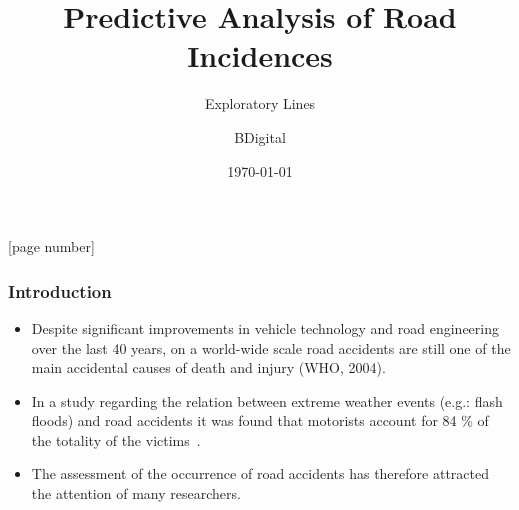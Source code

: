 \documentclass[hyperref={pdfpagelabels=true}]{beamer}
\title{Predictive Analysis of Road Incidences}
\subtitle{Exploratory Lines}
\author{BDigital}
\date{\today}
\begin{document}
\captionsetup{font=scriptsize,labelfont=scriptsize}

[page number]
\begin{frame}
\titlepage
\end{frame} 
 
\begin{frame}
\frametitle{Introduction}
\begin{overprint}
\begin{itemize}
\item Despite significant improvements in vehicle technology and road engineering over the last 40 years, on a world-wide scale 
road accidents are still one of the main accidental causes of death and injury (WHO, 2004).\\
\item In a study regarding the relation between extreme weather events (e.g.: flash floods) and road accidents it was found that motorists account for 84 \% of the totality of the
victims~\cite{calabria}.
\item The assessment of the occurrence of road accidents has therefore attracted the attention of many researchers.
\end{itemize}
\end{overprint}
\end{frame}
\end{document}
